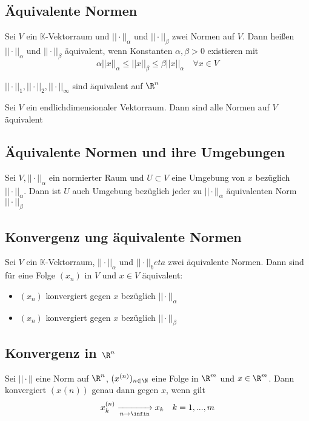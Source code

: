 	\subsection{Äquivalente Normen}
		\begin{Definition} [ ]
			Sei $V$ ein $\mathbb{K}$-Vektorraum und $||\cdot||_\alpha$ und $||\cdot||_\beta$ zwei Normen auf $V$. Dann heißen $||\cdot||_\alpha$ und $||\cdot||_\beta$ äquivalent, wenn Konstanten $\alpha, \beta > 0$ existieren mit 
			$$
				\alpha||x||_\alpha \leq ||x||_\beta \leq \beta||x||_\alpha \quad \forall x \in V
			$$
		\end{Definition}
		\begin{Satz} [ ]
			$||\cdot||_1, ||\cdot||_2, ||\cdot||_\infty$ sind äquivalent auf $\R^n$
		\end{Satz}
		\begin{Satz} [ ]
			Sei $V$ ein endlichdimensionaler Vektorraum. Dann sind alle Normen auf $V$ äquivalent
		\end{Satz}
	\subsection{Äquivalente Normen und ihre Umgebungen}
		\begin{Satz} [ ]
			Sei $V, ||\cdot||_\alpha$ ein normierter Raum und $U \subset V$ eine Umgebung von $x$ bezüglich $||\cdot||_\alpha$. Dann ist $U$ auch Umgebung bezüglich jeder zu $||\cdot||_\alpha$ äquivalenten Norm $||\cdot||_\beta$
		\end{Satz}
	\subsection{Konvergenz ung äquivalente Normen}
		\begin{Satz} [ ]
			Sei $V$ ein $\mathbb{K}$-Vektorraum, $||\cdot||_\alpha $ und $||\cdot||_beta$ zwei äquivalente Normen. Dann sind für eine Folge $(x_n)$ in $V$ und $x \in V$ äquivalent:
			\begin{itemize}
				\item $(x_n)$ konvergiert gegen $x$ bezüglich $||\cdot||_\alpha$
				\item $(x_n)$ konvergiert gegen $x$ bezüglich $||\cdot||_\beta$
			\end{itemize}
		\end{Satz}
	\subsection{Konvergenz in $\R^n$}
		\begin{Satz} [ ]
			Sei $||\cdot||$ eine Norm auf $\R^n$, $(x^{(n)})_{n\in\N}$ eine Folge in $\R^m$ und $x\in\R^m$. Dann konvergiert $(x^{}(n))$ genau dann gegen $x$, wenn gilt
			$$
				x^{(n)}_k \xrightarrow[n\to\infin]{}x_k \quad k=1,...,m
			$$
		\end{Satz}
